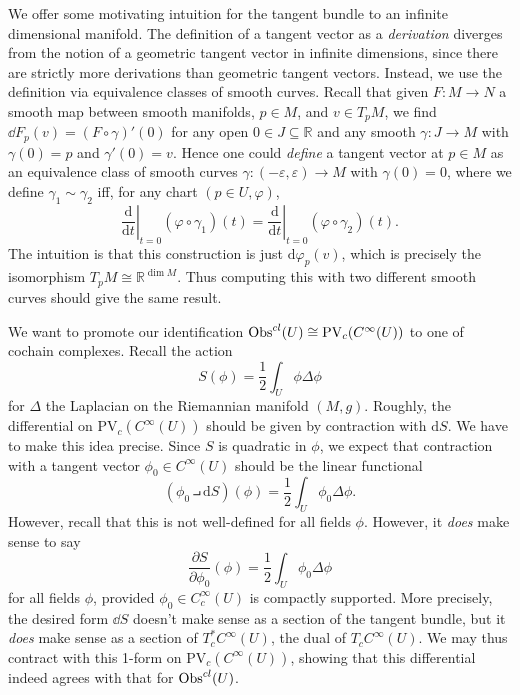 \begin{remark}\label{4.2.4}
	We offer some motivating intuition for the tangent bundle to an infinite dimensional manifold. The definition of a tangent vector as a \emph{derivation} diverges from the notion of a geometric tangent vector in infinite dimensions, since there are strictly more derivations than geometric tangent vectors. Instead, we use the definition via equivalence classes of smooth curves. Recall that given $F : M \to N$ a smooth map between smooth manifolds, $p\in M$, and $v\in T_pM$, we find $\dd F_p(v) = (F\circ \gamma )'(0)$ for any open $0\in J\subseteq \mathbb{R} $ and any smooth $\gamma : J \to M$ with $\gamma (0)=p$ and $\gamma '(0)=v$. Hence one could \emph{define} a tangent vector at $p\in M$ as an equivalence class of smooth curves $\gamma : (-\varepsilon ,\varepsilon ) \to M$ with $\gamma (0)=0$, where we define $\gamma _1 \sim \gamma _2$ iff, for any chart $(p\in U, \varphi )$,
	\[
		\left. \frac{\mathrm{d}}{\mathrm{d}t} \right|_{t=0} (\varphi \circ \gamma _1)(t) = \left. \frac{\mathrm{d}}{\mathrm{d}t} \right|_{t=0} (\varphi \circ \gamma _2)(t)
	.\]
	The intuition is that this construction is just $\mathrm{d} \varphi_p(v)$, which is precisely the isomorphism $T_pM \cong \mathbb{R} ^{\dim M} $. Thus computing this with two different smooth curves should give the same result.
\end{remark}

We want to promote our identification $\operatorname{Obs}^{cl} (U) \cong \mathrm{PV} _c(C^\infty (U))$ to one of cochain complexes. Recall the action
\[
	S(\phi )=\frac{1}{2} \int_{U} \phi \Delta \phi 
\]
for $\Delta $ the Laplacian on the Riemannian manifold $(M,g)$. Roughly, the  differential on $\mathrm{PV}_c(C^\infty (U))$ should be given by contraction with $\mathrm{d} S$. We have to make this idea precise. Since $S$ is quadratic in $\phi $, we expect that contraction with a tangent vector $\phi _0\in C^\infty (U)$ should be the linear functional
\[
	(\phi _0\intprod \mathrm{d} S)(\phi )=\frac{1}{2} \int_{U} \phi _0 \Delta \phi 
.\]
However, recall that this is not well-defined for all fields $\phi $. However, it \emph{does} make sense to say
\[
	\frac{\partial S}{\partial \phi _0} (\phi )=\frac{1}{2} \int_{U} \phi _0 \Delta \phi 
\]
for all fields $\phi $, provided $\phi _0\in C^\infty _c(U)$ is compactly supported. More precisely, the desired form $\dd S$ doesn't make sense as a section of the tangent bundle, but it \emph{does} make sense as a section of $T_c^*C^\infty (U)$, the dual of $T_cC^\infty (U)$. We may thus contract with this 1-form on $\mathrm{PV} _c(C^\infty (U))$, showing that this differential indeed agrees with that for $\operatorname{Obs}^{cl} (U)$.

